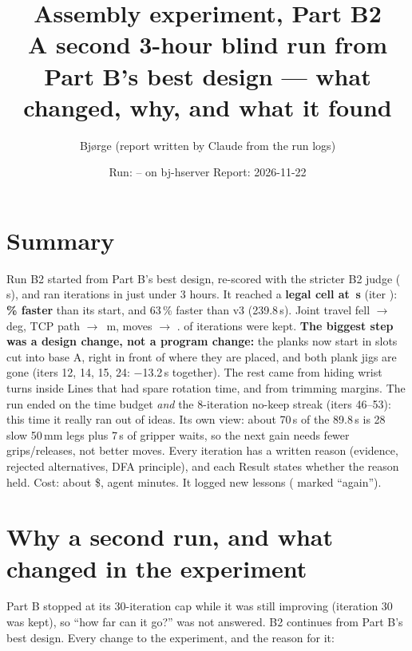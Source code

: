 



\title{\vspace{-14mm}\textbf{Assembly experiment, Part B2}\\[1mm]
\large A second 3-hour blind run from Part B's best design --- what changed, why, and what it found}
\author{Bjørge (report written by Claude from the run logs)}
\date{Run: \pbtwotstart{} -- \pbtwotend{} on bj-hserver \quad Report: 2026-11-22}


\maketitle
\thispagestyle{fancy}

\section*{Summary}
Run B2 started from Part B's best design, re-scored with the stricter B2 judge (\pbtwostartcycle{}\,s), and ran
\pbtwoniter{} iterations in just under 3 hours. It reached a \textbf{legal cell at \pbtwobestcycle{}\,s} (iter
\pbtwobestit{}): \textbf{\pbtwogainpct{}\,\% faster} than its start, and 63\,\% faster than v3 (239.8\,s). Joint
travel fell \pbtwostartjoints{} $\to$ \pbtwobestjoints{}\,deg, TCP path \pbtwostartpath{} $\to$ \pbtwobestpath{}\,m,
moves \pbtwostartmoves{} $\to$ \pbtwobestmoves{}. \pbtwonkept{} of \pbtwoniter{} iterations were kept.
\textbf{The biggest step was a design change, not a program change:} the planks now start in slots cut into base A,
right in front of where they are placed, and both plank jigs are gone (iters 12, 14, 15, 24: $-$13.2\,s together). The
rest came from hiding wrist turns inside Lines that had spare rotation time, and from trimming margins. The run
ended on the time budget \emph{and} the 8-iteration no-keep streak (iters 46--53): this time it really ran out of
ideas. Its own view: about 70\,s of the 89.8\,s is 28 slow 50\,mm legs plus 7\,s of gripper waits, so the next gain
needs fewer grips/releases, not better moves. Every iteration has a written reason (evidence, rejected alternatives,
DFA principle), and each Result states whether the reason held. Cost: about \$\pbtwocost{}, \pbtwoagentmin{} agent
minutes. It logged \pbtwonlessons{} new lessons (\pbtwonagain{} marked ``again'').

\section{Why a second run, and what changed in the experiment}
Part B stopped at its 30-iteration cap while it was still improving (iteration 30 was kept), so ``how far can it
go?'' was not answered. B2 continues from Part B's best design. Every change to the experiment, and the reason for it:

